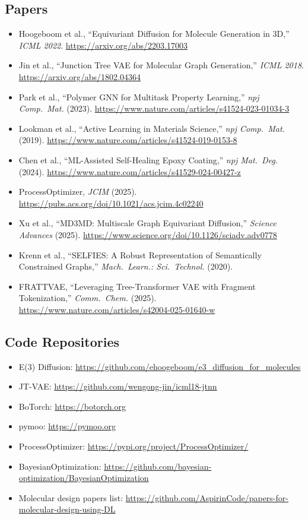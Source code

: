 \documentclass[11pt,a4paper]{article}
\begin{document}
\subsection{Papers}
\begin{itemize}[nosep]
  \item Hoogeboom et al., ``Equivariant Diffusion for Molecule Generation in 3D,'' \textit{ICML 2022}. \url{https://arxiv.org/abs/2203.17003}
  \item Jin et al., ``Junction Tree VAE for Molecular Graph Generation,'' \textit{ICML 2018}. \url{https://arxiv.org/abs/1802.04364}
  \item Park et al., ``Polymer GNN for Multitask Property Learning,'' \textit{npj Comp.\ Mat.} (2023). \url{https://www.nature.com/articles/s41524-023-01034-3}
  \item Lookman et al., ``Active Learning in Materials Science,'' \textit{npj Comp.\ Mat.} (2019). \url{https://www.nature.com/articles/s41524-019-0153-8}
  \item Chen et al., ``ML-Assisted Self-Healing Epoxy Coating,'' \textit{npj Mat.\ Deg.} (2024). \url{https://www.nature.com/articles/s41529-024-00427-z}
  \item ProcessOptimizer, \textit{JCIM} (2025). \url{https://pubs.acs.org/doi/10.1021/acs.jcim.4c02240}
  \item Xu et al., ``MD3MD: Multiscale Graph Equivariant Diffusion,'' \textit{Science Advances} (2025). \url{https://www.science.org/doi/10.1126/sciadv.adv0778}
  \item Krenn et al., ``SELFIES: A Robust Representation of Semantically Constrained Graphs,'' \textit{Mach.\ Learn.: Sci.\ Technol.} (2020).
  \item FRATTVAE, ``Leveraging Tree-Transformer VAE with Fragment Tokenization,'' \textit{Comm.\ Chem.} (2025). \url{https://www.nature.com/articles/s42004-025-01640-w}
\end{itemize}

\subsection{Code Repositories}
\begin{itemize}[nosep]
  \item E(3) Diffusion: \url{https://github.com/ehoogeboom/e3_diffusion_for_molecules}
  \item JT-VAE: \url{https://github.com/wengong-jin/icml18-jtnn}
  \item BoTorch: \url{https://botorch.org}
  \item pymoo: \url{https://pymoo.org}
  \item ProcessOptimizer: \url{https://pypi.org/project/ProcessOptimizer/}
  \item BayesianOptimization: \url{https://github.com/bayesian-optimization/BayesianOptimization}
  \item Molecular design papers list: \url{https://github.com/AspirinCode/papers-for-molecular-design-using-DL}
\end{itemize}
\end{document}
